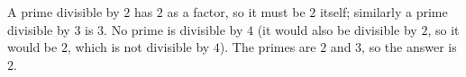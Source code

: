 A prime divisible by $2$ has $2$ as a factor, so it must be $2$ itself; similarly a prime divisible by $3$ is $3$. No prime is divisible by $4$ (it would also be divisible by $2$, so it would be $2$, which is not divisible by $4$). The primes are $2$ and $3$, so the answer is $\boxed{2}$.
